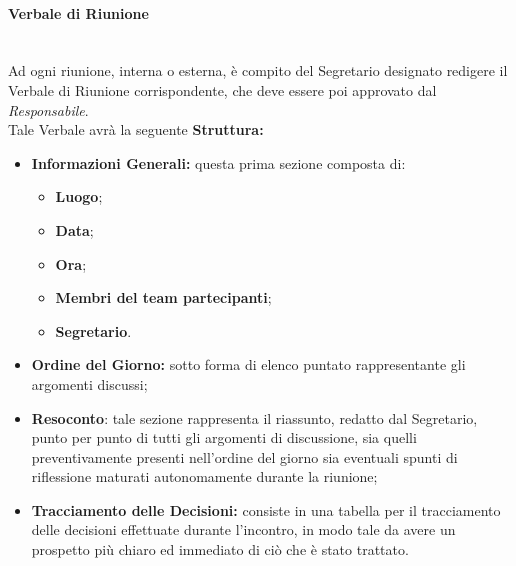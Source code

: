 \paragraph{Verbale di Riunione} ~\\
\label{VdR}
	Ad ogni riunione, interna o esterna, è compito del Segretario designato redigere il Verbale di Riunione 							corrispondente, che deve essere poi approvato dal \textit{Responsabile}.\\
	Tale Verbale avrà la seguente \textbf{Struttura:}
	\begin{itemize}
	\item \textbf{Informazioni Generali:} questa prima sezione composta di:
		\begin{itemize}
		\item \textbf{Luogo};
		\item \textbf{Data};
		\item \textbf{Ora};
		\item \textbf{Membri del team partecipanti};
		\item \textbf{Segretario}.
		\end{itemize}
	\item \textbf{Ordine del Giorno:} sotto forma di elenco puntato rappresentante gli argomenti discussi;
	\item \textbf{Resoconto}: tale sezione rappresenta il riassunto, redatto dal Segretario, punto per punto di tutti 		gli argomenti di discussione, sia quelli preventivamente presenti nell'ordine del giorno sia eventuali spunti 				di riflessione maturati autonomamente durante la riunione;
	\item \textbf{Tracciamento delle Decisioni:} consiste in una tabella per il tracciamento delle decisioni effettuate durante l'incontro, in modo tale da avere un prospetto più chiaro ed immediato di ciò che è stato trattato. 
	\end{itemize}
